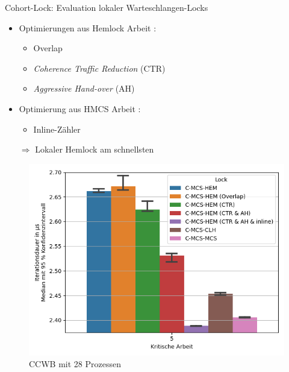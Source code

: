 \documentclass[fleqn,compress,utf8,aspectratio=169,t]{beamer}
\begin{document}
\begin{frame}{Cohort-Lock: Evaluation lokaler Warteschlangen-Locks}
    \begin{minipage}{.52\textwidth}
        \begin{itemize}
            \setlength\itemsep{.75em}
            \item Optimierungen aus Hemlock Arbeit \cite{Hemlock}:
                  \vspace{.75em}
                  \begin{itemize}
                      \setlength\itemsep{.75em}
                      \item Overlap
                      \item \textit{Coherence Traffic Reduction} (CTR)
                      \item \textit{Aggressive Hand-over} (AH)
                  \end{itemize}
            \item Optimierung aus HMCS Arbeit \cite{HMCS-Lock}:
                  \vspace{.75em}
                  \begin{itemize}
                      \setlength\itemsep{.75em}
                            \setlength\itemsep{.75em}
                      \item Inline-Zähler
                  \end{itemize}
            \item[$\Rightarrow$] Lokaler Hemlock am schnellsten
        \end{itemize}
    \end{minipage}
    \begin{minipage}{.47\textwidth}
        \begin{figure}
            \includegraphics[width=\textwidth]{../../Dokumentation/Latex/Bilder/benchmarks/intelmpi/cohort-hem/CCWB-processes=28-latency-max}
            \caption{CCWB mit 28 Prozessen}
        \end{figure}
    \end{minipage}
\end{frame}
\end{document}
